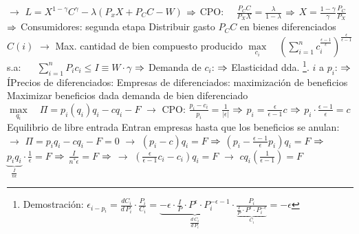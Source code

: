 \documentclass{nuevotema}
\begin{document}
\begin{esquemal}
				\4[] $\to$ $L = X^{1-\gamma} C^\gamma - \lambda (P_x X + P_C C - W)$
				\4[] $\Rightarrow$ CPO: $\quad \frac{P_C C}{P_X X} = \frac{\lambda}{1-\lambda}$
				\4[] $\Rightarrow$ \quad $X = \frac{1-\gamma}{\gamma} \frac{P_C}{P_X}$
				\4[] $\Rightarrow$ 
				\4 Consumidores: segunda etapa
				\4[] Distribuir gasto $P_C C$ en bienes diferenciados $C(i)$
				\4[] $\to$ Max. cantidad de bien compuesto producido
				\4[] $\underset{c_i}{\max} \quad \left( \sum_{i=1}^n c_i^{\frac{\epsilon-1}{\epsilon}} \right)^{\frac{\epsilon}{\epsilon -1}}$
				\4[] s.a: $\quad$ $\sum_{i=1}^n P_i c_i \leq I \equiv W \cdot \gamma$
				\4[] $\Rightarrow$ Demanda de $c_i$: 
				\4[] $\Rightarrow$ Elasticidad dda. \footnote{Demostración: $\epsilon_{i-p_i} = \frac{d C_i }{d \, P_i} \cdot \frac{P_i}{C_i} = \underbrace{-\epsilon \cdot \frac{I}{P} \cdot P^\epsilon \cdot P_i^{-\epsilon - 1} }_{\frac{d \, C_i}{d \, P_i}} \cdot \frac{P_i}{\underbrace{\frac{I}{P} \cdot P^\epsilon \cdot P_i^{-\epsilon}}_{C_i}} = - \epsilon $}. $i$ a $p_i$: 
				\4[] $\Rightarrow$ ÍPrecios de diferenciados: 
				\4 Empresas de diferenciados: maximización de beneficios
				\4[] Maximizar beneficios dada demanda de bien diferenciado
				\4[] $\underset{q_i}{\max} \quad \Pi = p_i (q_i) q_i - c q_i - F$
				\4[] $\to$ CPO: \quad $\frac{p_i - c_i}{p_i} = \frac{1}{\left| \epsilon \right|}$
				\4[] $\Rightarrow$ $p_i = \frac{\epsilon}{\epsilon-1} c$
				\4[] $\Rightarrow$ $p_i \cdot \frac{\epsilon-1}{\epsilon} = c$
				\4 Equilibrio de libre entrada
				\4[] Entran empresas hasta que los beneficios se anulan:
				\4[] $\to$ $\Pi = p_i q_i - c q_i - F = 0$
				\4[] $\to$ $(p_i -c) q_i = F$
				\4[] $\Rightarrow$ $(p_i - \frac{\epsilon - 1}{\epsilon} p_i) q_i = F$
				\4[] $\Rightarrow$ $\underbrace{p_i q_i}_{\frac{I}{n \epsilon}} \cdot \frac{1}{\epsilon} = F$
				\4[] $\Rightarrow$ $\frac{I}{n^* \epsilon}= F$ $\Rightarrow$ 
				\4[] $\to$ $ \left( \frac{\epsilon}{\epsilon-1}c_i - c_i \right) q_i= F$
				\4[] $\to$ $c q_i \left( \frac{1}{\epsilon -1 } \right) = F$


\end{esquemal}
\end{document}
